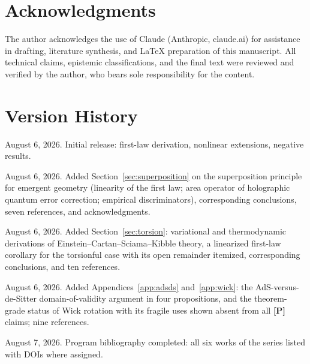 \documentclass[11pt]{article}
\theoremstyle{definition}
\newcommand{\pP}{\textbf{[P]}}
\begin{document}
\section*{Acknowledgments}
The author acknowledges the use of Claude (Anthropic, claude.ai) for
assistance in drafting, literature synthesis, and \LaTeX{} preparation of
this manuscript. All technical claims, epistemic classifications, and the
final text were reviewed and verified by the author, who bears sole
responsibility for the content.

\section*{Version History}
\begin{description}[leftmargin=2.2em,itemsep=0pt]
\item[v1] August 6, 2026. Initial release: first-law derivation, nonlinear
extensions, negative results.
\item[v2] August 6, 2026. Added Section~\ref{sec:superposition} on the
superposition principle for emergent geometry (linearity of the first law;
area operator of holographic quantum error correction; empirical
discriminators), corresponding conclusions, seven references, and
acknowledgments.
\item[v3] August 6, 2026. Added Section~\ref{sec:torsion}: variational and
thermodynamic derivations of Einstein--Cartan--Sciama--Kibble theory, a
linearized first-law corollary for the torsionful case with its open
remainder itemized, corresponding conclusions, and ten references.
\item[v4] August 6, 2026. Added Appendices~\ref{app:adsds}
and~\ref{app:wick}: the AdS-versus-de-Sitter domain-of-validity argument
in four propositions, and the theorem-grade status of Wick rotation with
its fragile uses shown absent from all \pP{} claims; nine references.
\item[v5] August 7, 2026. Program bibliography completed: all six works of
the series listed with DOIs where assigned.
\end{description}
\end{document}
